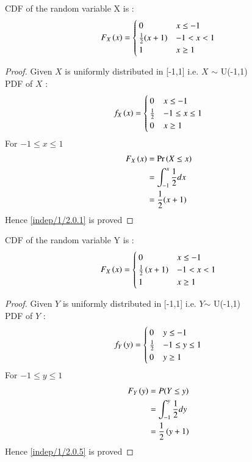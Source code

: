 \begin{lemma}
    CDF of the random variable X is : 
    \begin{equation}
       F_X\brak{x}=
       \begin{cases}
       0 & x\leq-1\\
       \frac{1}{2}(x+1) & -1<x<1\\
       1 & x\geq1 
       \end{cases}\label{indep/1/2.0.1}
    \end{equation}
   \end{lemma}
   \begin{proof}
   Given \(X\) is uniformly distributed in [-1,1] i.e. \(X\) \(\sim\) U(-1,1)
   \\PDF of \(X\) : 
   \begin{equation}
       f_{X}\left(x\right)=
       \begin{cases}
        0 & x\leq-1\\
        \frac{1}{2} & -1\leq x\leq 1\\
        0 & x\geq1
       \end{cases}
   \end{equation}
   For  \(-1\leq x\leq 1\)
   \begin{align}
     F_{X}\left(x\right)&=\Pr\left(X\leq x\right)\\
     &=\int_{-1}^x\frac{1}{2}dx\\
     &=\frac{1}{2}(x+1)
   \end{align}
   Hence \eqref{indep/1/2.0.1} is proved
   \end{proof}
   \begin{lemma}
    CDF of the random variable Y is : 
    \begin{equation}
       F_X\brak{x}=
       \begin{cases}
       0 & x\leq-1\\
       \frac{1}{2}\brak{x+1} & -1<x<1\\
       1 & x\geq1 
       \end{cases}\label{indep/1/2.0.5}
    \end{equation}
   \end{lemma}
   \begin{proof}
   Given \(Y\) is uniformly distributed in [-1,1] i.e. \(Y\)\(\sim\) U(-1,1)
   \\PDF of \(Y\) : 
   \begin{equation}
       f_{Y}\left(y\right)=
       \begin{cases}
        0 & y\leq-1\\
        \frac{1}{2} & -1\leq y\leq 1\\
        0 & y\geq1
       \end{cases}
   \end{equation}
   For  \(-1\leq y\leq 1\)
   \begin{align}
     F_{Y}\left(y\right)&=P(Y\leq y)\\
     &=\int_{-1}^y\frac{1}{2}dy\\
     &=\frac{1}{2}\left(y+1\right)
   \end{align}
   Hence \eqref{indep/1/2.0.5} is proved
   \end{proof}
